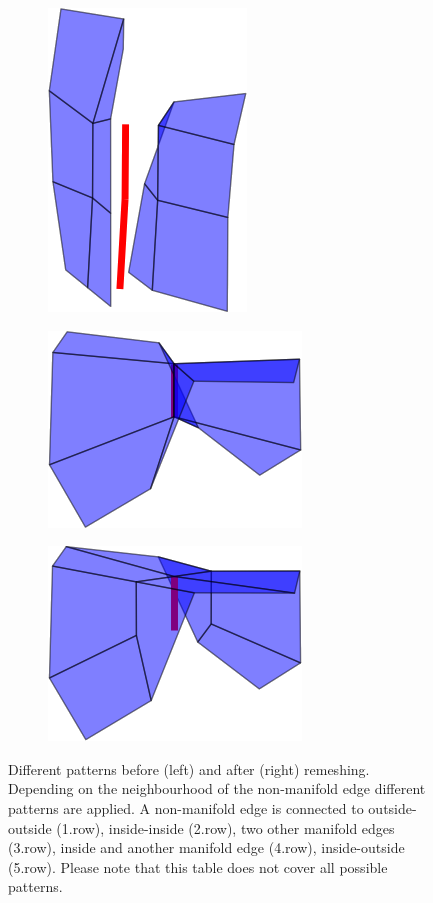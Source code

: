 \begin{figure}[p]
\begin{center}
\begin{subfigure}[b]{.45\textwidth}
\includegraphics[height = .17\textheight, width = .5\textwidth,keepaspectratio]{Pictures/SurfaceReconstruction/3DManifoldMIRes}
\end{subfigure}
\begin{subfigure}[b]{.45\textwidth}
\centering
\includegraphics[height = .17\textheight, width = .5\textwidth,keepaspectratio]{Pictures/SurfaceReconstruction/3DManifoldOI}
\end{subfigure}
\begin{subfigure}[b]{.45\textwidth}
\centering
\includegraphics[height = .17\textheight, width = .5\textwidth,keepaspectratio]{Pictures/SurfaceReconstruction/3DManifoldOIRes}
\end{subfigure}
\end{center}
\caption{Different patterns before (left) and after (right) remeshing. Depending on the neighbourhood of the non-manifold edge different patterns are applied. A non-manifold edge is connected to outside-outside (1.row), inside-inside (2.row), two other manifold edges (3.row), inside and another manifold edge (4.row), inside-outside (5.row). Please note that this table does not cover all possible patterns.}
\label{fig:manifoldPatterns3D}
\end{figure}
